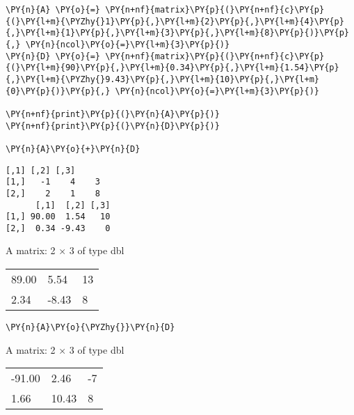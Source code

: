     \begin{tcolorbox}[breakable, size=fbox, boxrule=1pt, pad at break*=1mm,colback=cellbackground, colframe=cellborder]
\begin{Verbatim}[commandchars=\\\{\}]
\PY{n}{A} \PY{o}{=} \PY{n+nf}{matrix}\PY{p}{(}\PY{n+nf}{c}\PY{p}{(}\PY{l+m}{\PYZhy{}1}\PY{p}{,}\PY{l+m}{2}\PY{p}{,}\PY{l+m}{4}\PY{p}{,}\PY{l+m}{1}\PY{p}{,}\PY{l+m}{3}\PY{p}{,}\PY{l+m}{8}\PY{p}{)}\PY{p}{,} \PY{n}{ncol}\PY{o}{=}\PY{l+m}{3}\PY{p}{)}
\PY{n}{D} \PY{o}{=} \PY{n+nf}{matrix}\PY{p}{(}\PY{n+nf}{c}\PY{p}{(}\PY{l+m}{90}\PY{p}{,}\PY{l+m}{0.34}\PY{p}{,}\PY{l+m}{1.54}\PY{p}{,}\PY{l+m}{\PYZhy{}9.43}\PY{p}{,}\PY{l+m}{10}\PY{p}{,}\PY{l+m}{0}\PY{p}{)}\PY{p}{,} \PY{n}{ncol}\PY{o}{=}\PY{l+m}{3}\PY{p}{)}

\PY{n+nf}{print}\PY{p}{(}\PY{n}{A}\PY{p}{)}
\PY{n+nf}{print}\PY{p}{(}\PY{n}{D}\PY{p}{)}

\PY{n}{A}\PY{o}{+}\PY{n}{D}
\end{Verbatim}
\end{tcolorbox}

    \begin{Verbatim}[commandchars=\\\{\}]
     [,1] [,2] [,3]
[1,]   -1    4    3
[2,]    2    1    8
      [,1]  [,2] [,3]
[1,] 90.00  1.54   10
[2,]  0.34 -9.43    0
    \end{Verbatim}

    A matrix: 2 × 3 of type dbl
\begin{tabular}{lll}
	 89.00 &  5.54 & 13\\
	  2.34 & -8.43 &  8\\
\end{tabular}


    
    \begin{tcolorbox}[breakable, size=fbox, boxrule=1pt, pad at break*=1mm,colback=cellbackground, colframe=cellborder]
\begin{Verbatim}[commandchars=\\\{\}]
\PY{n}{A}\PY{o}{\PYZhy{}}\PY{n}{D}
\end{Verbatim}
\end{tcolorbox}

    A matrix: 2 × 3 of type dbl
\begin{tabular}{lll}
	 -91.00 &  2.46 & -7\\
	   1.66 & 10.43 &  8\\
\end{tabular}


